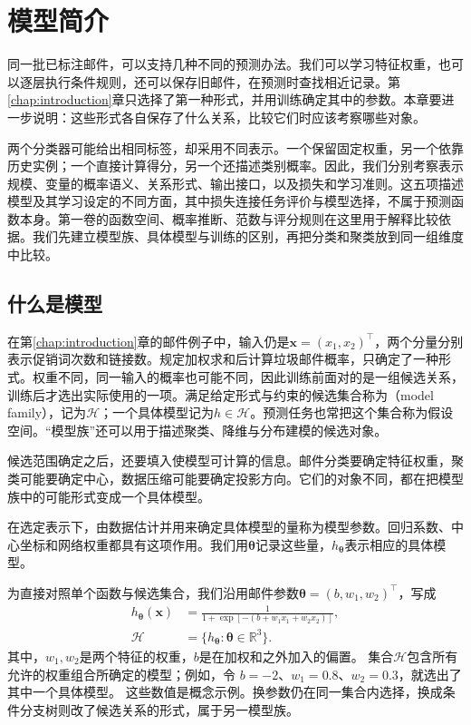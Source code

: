 \chapter{模型简介}
\label{chap:machine-learning-models}

同一批已标注邮件，可以支持几种不同的预测办法。我们可以学习特征权重，也可以逐层执行条件规则，还可以保存旧邮件，在预测时查找相近记录。第\ref{chap:introduction}章只选择了第一种形式，并用训练确定其中的参数。本章要进一步说明：这些形式各自保存了什么关系，比较它们时应该考察哪些对象。

两个分类器可能给出相同标签，却采用不同表示。一个保留固定权重，另一个依靠历史实例；一个直接计算得分，另一个还描述类别概率。因此，我们分别考察表示规模、变量的概率语义、关系形式、输出接口，以及损失和学习准则。这五项描述模型及其学习设定的不同方面，其中损失连接任务评价与模型选择，不属于预测函数本身。第一卷的函数空间、概率推断、范数与评分规则在这里用于解释比较依据。我们先建立模型族、具体模型与训练的区别，再把分类和聚类放到同一组维度中比较。

\section{什么是模型}
\label{sec:models-meaning}

在第\ref{chap:introduction}章的邮件例子中，输入仍是$\bm{x}=(x_1,x_2)^{\top}$，两个分量分别表示促销词次数和链接数。规定加权求和后计算垃圾邮件概率，只确定了一种形式。权重不同，同一输入的概率也可能不同，因此训练前面对的是一组候选关系，训练后才选出实际使用的一项。满足给定形式与约束的候选集合称为（model family），记为$\mathcal H$；一个具体模型记为$h\in\mathcal H$。预测任务也常把这个集合称为假设空间。“模型族”还可以用于描述聚类、降维与分布建模的候选对象。

候选范围确定之后，还要填入使模型可计算的信息。邮件分类要确定特征权重，聚类可能要确定中心，数据压缩可能要确定投影方向。它们的对象不同，都在把模型族中的可能形式变成一个具体模型。

在选定表示下，由数据估计并用来确定具体模型的量称为模型参数。回归系数、中心坐标和网络权重都具有这项作用。我们用$\bm{\theta}$记录这些量，$h_{\bm{\theta}}$表示相应的具体模型。

为直接对照单个函数与候选集合，我们沿用邮件参数$\bm{\theta}=(b,w_1,w_2)^{\top}$，写成
\begin{equation}
  \begin{aligned}
    h_{\bm{\theta}}(\bm{x})
      &=\frac{1}{1+\exp[-(b+w_1x_1+w_2x_2)]},\\
    \mathcal{H}&=\{h_{\bm{\theta}}:\bm{\theta}\in\mathbb{R}^{3}\}.
  \end{aligned}
  \label{eq:models-family-example}
\end{equation}
其中，$w_1,w_2$是两个特征的权重，$b$是在加权和之外加入的偏置。
集合$\mathcal{H}$包含所有允许的权重组合所确定的模型；例如，令
$b=-2$、$w_1=0.8$、$w_2=0.3$，就选出了其中一个具体模型。
这些数值是概念示例。换参数仍在同一集合内选择，换成条件分支树则改了候选关系的形式，属于另一模型族。

